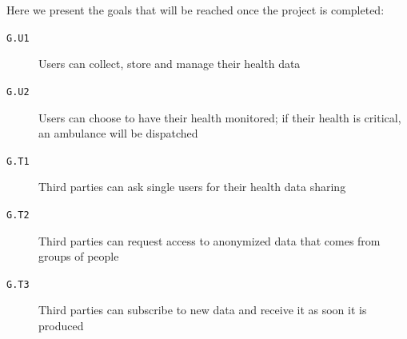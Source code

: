 \documentclass[12pt]{article}
\def \thisDocVersion {\texttt{v.0}}
\begin{document}
        Here we present the goals that will be reached once the project is completed:

        \begin{description}
          \item[\texttt{G.U1}] Users can collect, store and manage their health data
          \item[\texttt{G.U2}] Users can choose to have their health monitored; if their health is critical, an ambulance will be dispatched
          \item[\texttt{G.T1}] Third parties can ask single users for their health data sharing
          \item[\texttt{G.T2}] Third parties can request access to anonymized data that comes from groups of people
          \item[\texttt{G.T3}] Third parties can subscribe to new data and receive it as soon it is produced
        \end{description}


\end{document}
